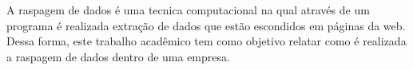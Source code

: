 \begin{resumo} 
  A raspagem de dados é uma tecnica computacional na qual através de um programa é realizada extração de dados que estão escondidos em páginas da web. Dessa forma, este trabalho acadêmico tem como objetivo relatar como é realizada a raspagem de dados dentro de uma empresa.
  \end{resumo}

\begin{abstract}
  [do write your abstract in english, use Google Translate and do corrections]
\end{abstract}